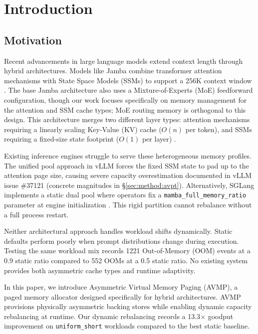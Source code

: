 \section{Introduction}
\label{sec:intro}

\subsection{Motivation}
\label{sec:intro:motivation}

Recent advancements in large language models extend context length through hybrid architectures. Models like Jamba combine transformer attention mechanisms with State Space Models (SSMs) to support a 256K context window \cite{lieber2024jamba}. The base Jamba architecture also uses a Mixture-of-Experts (MoE) feedforward configuration, though our work focuses specifically on memory management for the attention and SSM cache types; MoE routing memory is orthogonal to this design. This architecture merges two different layer types: attention mechanisms requiring a linearly scaling Key-Value (KV) cache ($O(n)$ per token), and SSMs requiring a fixed-size state footprint ($O(1)$ per layer) \cite{dao2024mamba2}.

Existing inference engines struggle to serve these heterogeneous memory profiles. The unified pool approach in vLLM \cite{kwon2023pagedattention} forces the fixed SSM state to pad up to the attention page size, causing severe capacity overestimation documented in vLLM issue \#37121 (concrete magnitudes in \S\ref{sec:method:avpt}). Alternatively, SGLang implements a static dual pool where operators fix a \texttt{mamba\_full\_memory\_ratio} parameter at engine initialization \cite{zheng2024sglang}. This rigid partition cannot rebalance without a full process restart.

Neither architectural approach handles workload shifts dynamically. Static defaults perform poorly when prompt distributions change during execution. Testing the same workload mix records 1221 Out-of-Memory (OOM) events at a 0.9 static ratio compared to 552 OOMs at a 0.5 static ratio. No existing system provides both asymmetric cache types and runtime adaptivity.

In this paper, we introduce Asymmetric Virtual Memory Paging (AVMP), a paged memory allocator designed specifically for hybrid architectures. AVMP provisions physically asymmetric backing stores while enabling dynamic capacity rebalancing at runtime. Our dynamic rebalancing records a 13.3$\times$ goodput improvement on \texttt{uniform\_short} workloads compared to the best static baseline.

